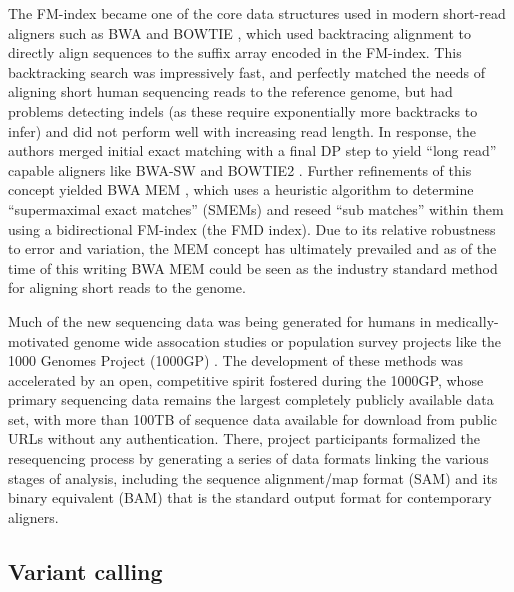 The FM-index became one of the core data structures used in modern short-read aligners such as BWA \cite{li2009fast} and BOWTIE \cite{langmead2009ultrafast}, which used backtracing alignment to directly align sequences to the suffix array encoded in the FM-index.
This backtracking search was impressively fast, and perfectly matched the needs of aligning short human sequencing reads to the reference genome, but had problems detecting indels (as these require exponentially more backtracks to infer) and did not perform well with increasing read length.
In response, the authors merged initial exact matching with a final DP step to yield ``long read'' capable aligners like BWA-SW \cite{li2010fast} and BOWTIE2 \cite{langmead2012fast}.
Further refinements of this concept yielded BWA MEM \cite{li2013aligning}, which uses a heuristic algorithm to determine ``supermaximal exact matches'' (SMEMs) and reseed ``sub matches'' within them using a bidirectional FM-index (the FMD index).
Due to its relative robustness to error and variation, the MEM concept has ultimately prevailed and as of the time of this writing BWA MEM could be seen as the industry standard method for aligning short reads to the genome.

Much of the new sequencing data was being generated for humans in medically-motivated genome wide assocation studies \cite{uk10k2015uk10k} or population survey projects like the 1000 Genomes Project (1000GP) \cite{1000Gphase1,1000g2015}.
The development of these methods was accelerated by an open, competitive spirit fostered during the 1000GP, whose primary sequencing data remains the largest completely publicly available data set, with more than 100TB of sequence data available for download from public URLs without any authentication.
There, project participants formalized the resequencing process by generating a series of data formats linking the various stages of analysis, including the sequence alignment/map format (SAM) and its binary equivalent (BAM) \cite{li2009sequence} that is the standard output format for contemporary aligners.


\subsection{Variant calling}

